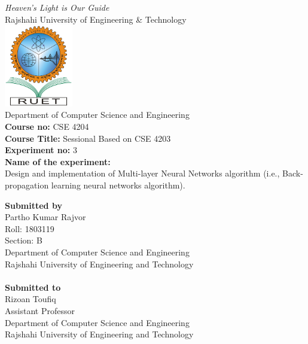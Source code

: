 \begin{center}
    \textit{Heaven’s Light is Our Guide} \\
    \vspace{1cm}
    \Large{Rajshahi University of Engineering \& Technology} \\
    \vspace{1cm}
    \includegraphics[width=3cm]{ruet-logo.png}\\
    \vspace{0.1cm}
    \Large{Department of Computer Science and Engineering} \\
    \vspace{1cm}
    \large{\textbf{Course no:} CSE 4204} \\
    \large{\textbf{Course Title:} Sessional Based on CSE 4203} \\
    \large{\textbf{Experiment no:} 3}\\
    \large{\textbf{Name of the experiment:}} \\
    \large{Design and implementation of Multi-layer
    Neural Networks algorithm (i.e., Back-propagation learning neural
    networks algorithm).} \\
    \vspace{1cm}
\end{center}
\thispagestyle{empty}
\Large{\textbf{Submitted by}}\\
Partho Kumar Rajvor \\
Roll: 1803119 \\
Section: B \\
Department of Computer Science and Engineering\\
Rajshahi University of Engineering and Technology\\\\
\Large{\textbf{Submitted to}}\\
Rizoan Toufiq \\
Assistant Professor \\
Department of Computer Science and Engineering \\
Rajshahi University of Engineering and Technology
\tableofcontents

\setcounter{chapter}{2}
